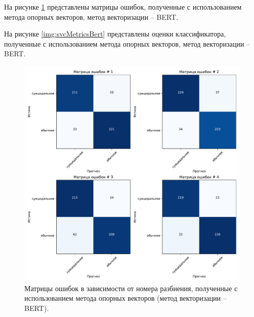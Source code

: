 На рисунке \ref{img:svcMatrBert} представлены матрицы ошибок, полученные с использованием метода опорных векторов, метод векторизации -- BERT.

На рисунке \ref{img:svcMetricsBert} представлены оценки классификатора, полученные с использованием метода опорных векторов, метод векторизации -- BERT.

\begin{figure}[H]
	\centering
	\includegraphics[width=\textwidth]{inc/plots/svcMatrBert.pdf}
	\caption{ Матрицы ошибок в зависимости от номера разбиения, полученные с использованием метода опорных векторов (метод векторизации -- BERT). }
	\label{img:svcMatrBert}
\end{figure}


